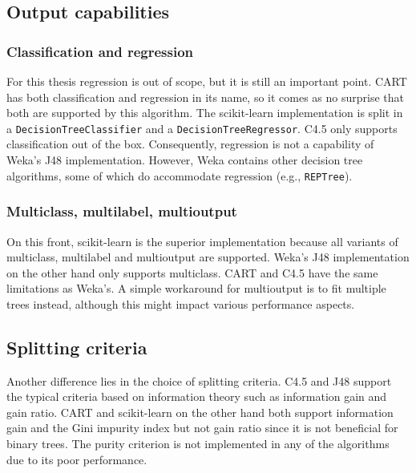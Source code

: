\subsection{Output capabilities}
\subsubsection{Classification and regression}
For this thesis regression is out of scope, but it is still an important point. CART has both classification and regression in its name, so it comes as no surprise that both are supported by this algorithm. The scikit-learn implementation is split in a \texttt{DecisionTreeClassifier} and a \texttt{DecisionTreeRegressor}. C4.5 only supports classification out of the box. Consequently, regression is not a capability of Weka's J48 implementation. However, Weka contains other decision tree algorithms, some of which do accommodate regression (e.g., \texttt{REPTree}).

\subsubsection{Multiclass, multilabel, multioutput}
On this front, scikit-learn is the superior implementation because all variants of multiclass, multilabel and multioutput are supported. Weka's J48 implementation on the other hand only supports multiclass. CART and C4.5 have the same limitations as Weka's. A simple workaround for multioutput is to fit multiple trees instead, although this might impact various performance aspects.

\subsection{Splitting criteria}
Another difference lies in the choice of splitting criteria. C4.5 and J48 support the typical criteria based on information theory such as information gain and gain ratio. CART and scikit-learn on the other hand both support information gain and the Gini impurity index but not gain ratio since it is not beneficial for binary trees. The purity criterion is not implemented in any of the algorithms due to its poor performance.

